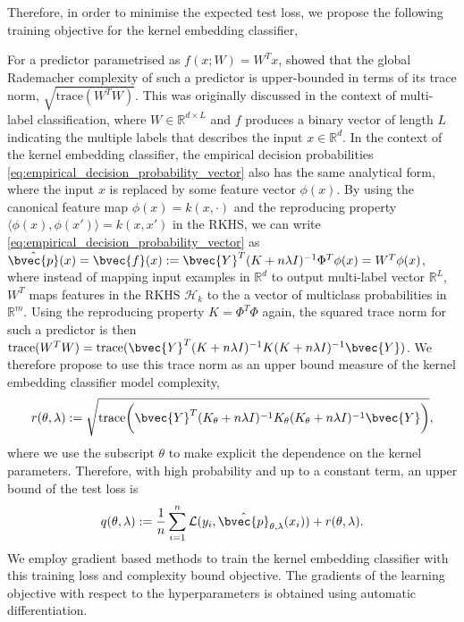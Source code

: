 \documentclass{article}
\begin{document}
			Therefore, in order to minimise the expected test loss, we propose the following training objective for the kernel embedding classifier,
			
			
			
			
	For a predictor parametrised as $f(x; W) = W^{T} x$, \cite{yu2014large} showed that the global Rademacher complexity of such a predictor is upper-bounded in terms of its trace norm, $\sqrt{\mathrm{trace}(W^{T} W)}$. This was originally discussed in the context of multi-label classification, where $W \in \mathbb{R}^{d \times L}$ and $f$ produces a binary vector of length $L$ indicating the multiple labels that describes the input $x \in \mathbb{R}^{d}$. In the context of the kernel embedding classifier, the empirical decision probabilities \eqref{eq:empirical_decision_probability_vector} also has the same analytical form, where the input $x$ is replaced by some feature vector $\phi(x)$. By using the canonical feature map $\phi(x) = k(x, \cdot)$ and the reproducing property $\langle \phi(x), \phi(x') \rangle = k(x, x')$ in the RKHS, we can write \eqref{eq:empirical_decision_probability_vector} as $\hat{\bvec{p}}(x) = \bvec{f}(x) := \bvec{Y}^{T} (K + n \lambda I)^{-1} \Phi^{T} \phi(x) = W^{T} \phi(x)$, where instead of mapping input examples in $\mathbb{R}^{d}$ to output multi-label vector $\mathbb{R}^{L}$, $W^{T}$ maps features in the RKHS $\mathcal{H}_{k}$ to the a vector of multiclass probabilities in $\mathbb{R}^{m}$. Using the reproducing property $K = \Phi^{T} \Phi$ again, the squared trace norm for such a predictor is then $\mathrm{trace}(W^{T} W) = \mathrm{trace}(\bvec{Y}^{T} (K + n \lambda I)^{-1} K (K + n \lambda I)^{-1} \bvec{Y})$. We therefore propose to use this trace norm as an upper bound measure of the kernel embedding classifier model complexity,
	\begin{equation}
		r(\theta, \lambda) := \sqrt{\mathrm{trace}\bigg(\bvec{Y}^{T} (K_{\theta} + n \lambda I)^{-1} K_{\theta} (K_{\theta} + n \lambda I)^{-1} \bvec{Y}\bigg)},
	\label{eq:trace_norm}
	\end{equation}
	where we use the subscript $\theta$ to make explicit the dependence on the kernel parameters. Therefore, with high probability and up to a constant term, an upper bound of the test loss is
	\begin{equation}
		q(\theta, \lambda) := \frac{1}{n} \sum_{i = 1}^{n} \mathcal{L}(y_{i}, \hat{\bvec{p}}_{\theta, \lambda}(x_{i})) + r(\theta, \lambda).
	\label{eq:objective}
	\end{equation}
	We employ gradient based methods to train the kernel embedding classifier with this training loss and complexity bound objective. The gradients of the learning objective with respect to the hyperparameters is obtained using automatic differentiation.
	
\end{document}
